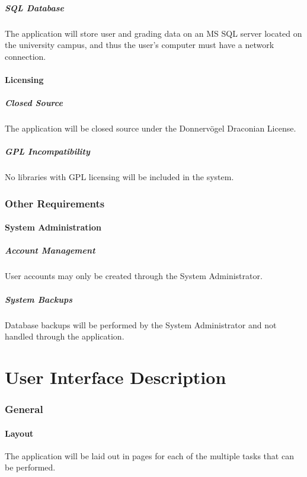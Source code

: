 \documentclass{article}
\begin{document}
\subsubsection{SQL Database}
The application will store user and grading data on an MS SQL server located on
the university campus, and thus the user's computer must have a network connection.
\subsection{Licensing}
\subsubsection{Closed Source}
The application will be closed source under the Donnervögel Draconian License.
\subsubsection{GPL Incompatibility}
No libraries with GPL licensing will be included in the system.

\section{Other Requirements}
\subsection{System Administration}
\subsubsection{Account Management}
User accounts may only be created through the System Administrator.
\subsubsection{System Backups}
Database backups will be performed by the System Administrator and not handled
through the application.

\part{User Interface Description}

\section{General}
\subsection{Layout}
The application will be laid out in pages for each of the multiple tasks that
can be performed.
\end{document}
